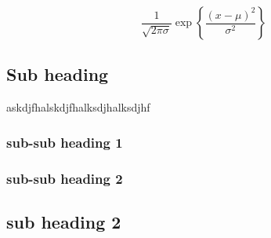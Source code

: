 \documentclass[
]{article}
\begin{document}
\[
\frac{1}{\sqrt{2\pi\sigma}} \exp{\left\lbrace \frac{(x-\mu)^2}{\sigma^2} \right\rbrace}
\]

\hypertarget{sub-heading}{%
\subsection{Sub heading}\label{sub-heading}}

askdjfhalskdjfhalksdjhalksdjhf

\hypertarget{sub-sub-heading-1}{%
\subsubsection{sub-sub heading 1}\label{sub-sub-heading-1}}

\hypertarget{sub-sub-heading-2}{%
\subsubsection{sub-sub heading 2}\label{sub-sub-heading-2}}

\hypertarget{sub-heading-2}{%
\subsection{sub heading 2}\label{sub-heading-2}}
\end{document}
